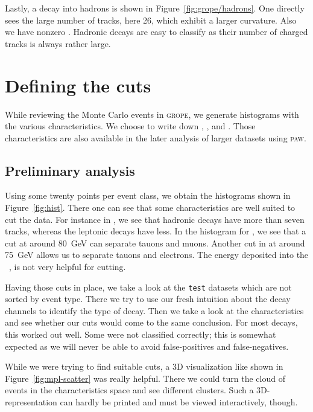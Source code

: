\documentclass[11pt, english, fleqn, DIV=15, headinclude, BCOR=2cm]{scrreprt}
\begin{document}
Lastly, a decay into hadrons is shown in Figure~\ref{fig:grope/hadrons}. One
directly sees the large number of tracks, here 26, which exhibit a larger
curvature. Also we have nonzero \ehcal{}. Hadronic decays are easy to classify
as their number of charged tracks is always rather large.

\section{Defining the cuts}

While reviewing the Monte Carlo events in \textsc{grope}, we generate
histograms with the various characteristics. We choose to write down
\ncharged{}, \pcharged{}, \eecal{} and \ehcal{}. Those characteristics are also
available in the later analysis of larger datasets using \textsc{paw}.

\subsection{Preliminary analysis}

Using some twenty points per event class, we obtain the histograms shown in
Figure~\ref{fig:hist}. There one can see that some characteristics are well
suited to cut the data. For instance in \ncharged, we see that hadronic decays
have more than seven tracks, whereas the leptonic decays have less. In the
histogram for \pcharged, we see that a cut at around \SI{80}{\giga\electronvolt}
can separate tauons and muons. Another cut in \eecal{} at around
\SI{75}{\giga\electronvolt} allows us to separate tauons and electrons. The
energy deposited into the \hcal\, \eecal, is not very helpful for cutting.



Having those cuts in place, we take a look at the \texttt{test} datasets which
are not sorted by event type. There we try to use our fresh intuition about the
decay channels to identify the type of decay. Then we take a look at the
characteristics and see whether our cuts would come to the same conclusion. For
most decays, this worked out well. Some were not classified correctly; this is
somewhat expected as we will never be able to avoid false-positives and
false-negatives.

While we were trying to find suitable cuts, a 3D visualization like shown in
Figure~\ref{fig:mpl-scatter} was really helpful. There we could turn the cloud
of events in the characteristics space and see different clusters. Such a
3D-representation can hardly be printed and must be viewed interactively,
though.
\end{document}
